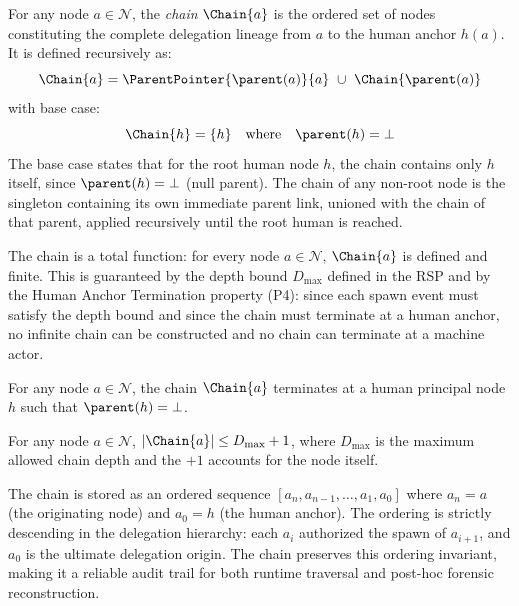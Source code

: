 \begin{dfn}[Chain]
\label{dfn:chain}
For any node $a \in \mathcal{N}$, the \emph{chain} $\Chain{a}$ is the ordered set of nodes constituting the complete delegation lineage from $a$ to the human anchor $h(a)$. It is defined recursively as:
\begin{equation}
\Chain{a} = \ParentPointer{\parent(a)}{a} \ \cup\ \Chain{\parent(a)}
\label{eq:chain-recursive}
\end{equation}
with base case:
\begin{equation}
\Chain{h} = \{h\}
\quad \text{where} \quad \parent(h) = \bot
\label{eq:chain-base}
\end{equation}
The base case states that for the root human node $h$, the chain contains only $h$ itself, since $\parent(h) = \bot$ (null parent). The chain of any non-root node is the singleton containing its own immediate parent link, unioned with the chain of that parent, applied recursively until the root human is reached.
\end{dfn}

The chain is a total function: for every node $a \in \mathcal{N}$, $\Chain{a}$ is defined and finite. This is guaranteed by the depth bound $D_{\max}$ defined in the RSP and by the Human Anchor Termination property (P4): since each spawn event must satisfy the depth bound and since the chain must terminate at a human anchor, no infinite chain can be constructed and no chain can terminate at a machine actor.

\begin{corol}
\label{corol:chain-terminates-human}
For any node $a \in \mathcal{N}$, the chain $\Chain{a}$ terminates at a human principal node $h$ such that $\parent(h) = \bot$.
\end{corol}

\begin{corol}
\label{corol:chain-finite}
For any node $a \in \mathcal{N}$, $|\Chain{a}| \leq D_{\max} + 1$, where $D_{\max}$ is the maximum allowed chain depth and the $+1$ accounts for the node itself.
\end{corol}

The chain is stored as an ordered sequence $[a_n, a_{n-1}, \ldots, a_1, a_0]$ where $a_n = a$ (the originating node) and $a_0 = h$ (the human anchor). The ordering is strictly descending in the delegation hierarchy: each $a_i$ authorized the spawn of $a_{i+1}$, and $a_0$ is the ultimate delegation origin. The chain preserves this ordering invariant, making it a reliable audit trail for both runtime traversal and post-hoc forensic reconstruction.

